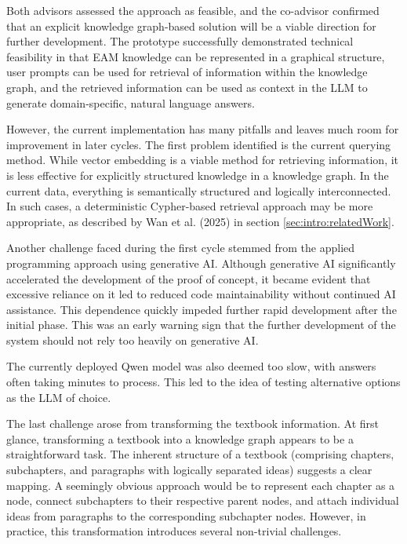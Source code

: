 Both advisors assessed the approach as feasible, and the co-advisor confirmed that an explicit knowledge graph-based solution will be a viable direction for further development. The prototype successfully demonstrated technical feasibility in that EAM knowledge can be represented in a graphical structure, user prompts can be used for retrieval of information within the knowledge graph, and the retrieved information can be used as context in the LLM to generate domain-specific, natural language answers.

However, the current implementation has many pitfalls and leaves much room for improvement in later cycles. The first problem identified is the current querying method. While vector embedding is a viable method for retrieving information, it is less effective for explicitly structured knowledge in a knowledge graph. In the current data, everything is semantically structured and logically interconnected. In such cases, a deterministic Cypher-based retrieval approach may be more appropriate, as described by Wan et al. (2025) \cite{wan2025prompting} in section \ref{sec:intro:relatedWork}.

Another challenge faced during the first cycle stemmed from the applied programming approach using generative AI. Although generative AI significantly accelerated the development of the proof of concept, it became evident that excessive reliance on it led to reduced code maintainability without continued AI assistance. This dependence quickly impeded further rapid development after the initial phase. This was an early warning sign that the further development of the system should not rely too heavily on generative AI.

The currently deployed Qwen model was also deemed too slow, with answers often taking minutes to process. This led to the idea of testing alternative options as the LLM of choice.

The last challenge arose from transforming the textbook information. At first glance, transforming a textbook into a knowledge graph appears to be a straightforward task. The inherent structure of a textbook (comprising chapters, subchapters, and paragraphs with logically separated ideas) suggests a clear mapping. A seemingly obvious approach would be to represent each chapter as a node, connect subchapters to their respective parent nodes, and attach individual ideas from paragraphs to the corresponding subchapter nodes. However, in practice, this transformation introduces several non-trivial challenges.

